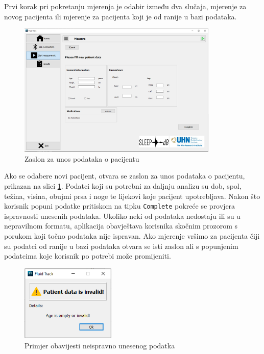 \documentclass[../diplomski_rad.tex]{subfiles}
\begin{document}
Prvi korak pri pokretanju mjerenja je odabir između dva slučaja, mjerenje za novog pacijenta ili 
mjerenje za pacijenta koji je od ranije u bazi podataka.

\begin{figure}[htb]
    \centering
    \includegraphics[width=0.85\textwidth]{Figures/patient.png} 
    \caption{Zaslon za unos podataka o pacijentu}
    \label{slk:patient}
\end{figure}

Ako se odabere novi pacijent, otvara se zaslon za unos podataka o pacijentu, prikazan na slici \ref{slk:patient}. 
Podatci koji su potrebni za daljnju analizu su dob, spol, težina, visina, obujmi prsa i noge te lijekovi koje pacijent upotrebljava. 
Nakon što korisnik popuni podatke pritiskom na tipku \texttt{Complete} pokreće se provjera ispravnosti unesenih podataka. 
Ukoliko neki od podataka nedostaju ili su u nepravilnom formatu, aplikacija obavještava korisnika skočnim prozorom s 
porukom koji točno podataka nije ispravan. 
Ako mjerenje vršimo za pacijenta čiji su podatci od ranije u bazi podataka otvara se isti zaslon ali s popunjenim podatcima 
koje korisnik po potrebi može promijeniti.  

\begin{figure}[htb]
    \centering
    \includegraphics[width=0.4\textwidth]{Figures/invalid_data.png} 
    \caption{Primjer obavijesti neispravno unesenog podatka}
    \label{slk:invalid_data}
\end{figure}
\end{document}
